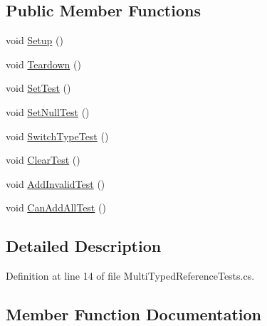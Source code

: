 \subsection*{Public Member Functions}
\begin{DoxyCompactItemize}
\item 
void \mbox{\hyperlink{class_leap_1_1_unity_1_1_tests_1_1_multi_typed_reference_tests_a521a157d884252bc41c6d83250641e2e}{Setup}} ()
\item 
void \mbox{\hyperlink{class_leap_1_1_unity_1_1_tests_1_1_multi_typed_reference_tests_aa080a2a3bc977eaf3b40964fae60860c}{Teardown}} ()
\item 
void \mbox{\hyperlink{class_leap_1_1_unity_1_1_tests_1_1_multi_typed_reference_tests_a3cecddcc8983dc022fe31872dff40af3}{Set\+Test}} ()
\item 
void \mbox{\hyperlink{class_leap_1_1_unity_1_1_tests_1_1_multi_typed_reference_tests_a1463a97bc1f1fe51ae14089727566a10}{Set\+Null\+Test}} ()
\item 
void \mbox{\hyperlink{class_leap_1_1_unity_1_1_tests_1_1_multi_typed_reference_tests_a8f04e00a4092e378462b39dd15b735c6}{Switch\+Type\+Test}} ()
\item 
void \mbox{\hyperlink{class_leap_1_1_unity_1_1_tests_1_1_multi_typed_reference_tests_a96db2691ce3ea40dacc1e7074b34be46}{Clear\+Test}} ()
\item 
void \mbox{\hyperlink{class_leap_1_1_unity_1_1_tests_1_1_multi_typed_reference_tests_ac9875ba9bfdb9832143b3fabf832d3d1}{Add\+Invalid\+Test}} ()
\item 
void \mbox{\hyperlink{class_leap_1_1_unity_1_1_tests_1_1_multi_typed_reference_tests_a2d87c654b7b44ad14bd65fea7b0a9f1c}{Can\+Add\+All\+Test}} ()
\end{DoxyCompactItemize}


\subsection{Detailed Description}


Definition at line 14 of file Multi\+Typed\+Reference\+Tests.\+cs.



\subsection{Member Function Documentation}
\mbox{\label{class_leap_1_1_unity_1_1_tests_1_1_multi_typed_reference_tests_ac9875ba9bfdb9832143b3fabf832d3d1}} 
